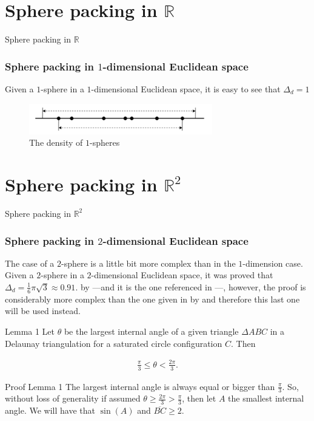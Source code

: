 \documentclass[10pt]{beamer}
\begin{document}
\section{Sphere packing in $\mathbb{R}$}

\begin{frame}{Sphere packing in $\mathbb{R}$}
    \frametitle{Sphere packing in $1$-dimensional Euclidean space}
    
    Given a $1$-sphere in a $1$-dimensional Euclidean space, it is easy to see that $\Delta_d = 1$
    \begin{figure}[t]
    \includegraphics[width=8cm]{0.png}
    \centering
    \caption{The density of $1$-spheres }
    \end{figure}
\end{frame}

\section{Sphere packing in $\mathbb{R}^2$}

\begin{frame}{Sphere packing in $\mathbb{R}^2$}
    \frametitle{Sphere packing in $2$-dimensional Euclidean space}
    
    The case of a $2$-sphere is a little bit more complex than in the $1$-dimension case. Given a $2$-sphere in a $2$-dimensional Euclidean space, it was proved that $\Delta_d = \frac{1}{6} \pi \sqrt{3} \approx 0.91$. by \cite{thue1911dichteste}---and it is the one referenced in \cite{viazovska2017sphere}---, however, the proof is considerably more complex than the one given in by \cite{chang2010simple} and therefore this last one will be used instead. 
    
    
    \begin{block}{Lemma 1}
    Let $\theta$ be the largest internal angle of a given triangle $\Delta ABC$ in a Delaunay
triangulation for a saturated circle configuration $C$. Then

    \begin{equation} \label{4}
    \begin{split}
        \frac{\pi}{3} \leq \theta < \frac{2 \pi}{3}.
    \end{split}
    \end{equation}
    \end{block}
    
    \begin{block}{Proof Lemma 1}
    The largest internal angle is always equal or bigger than $\frac{\pi}{3}$. So, without loss of generality if assumed $\theta \geq \frac{2\pi}{3} > \frac{\pi}{3}$, then let $A$ the smallest internal angle. We will have that $\sin(A)$ and $\overline{BC} \geq 2$. 
    \vspace{1cm}
    \end{block}
\end{frame}
\end{document}
